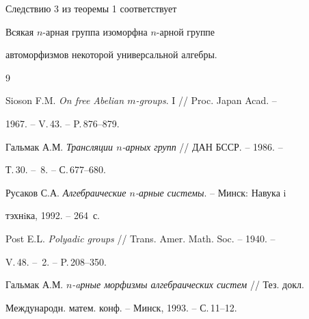 Следствию 3 из теоремы 1 соответствует





\begin{cor}


Всякая $n$-арная группа изоморфна $n$-арной группе


автоморфизмов некоторой универсальной алгебры.


\end{cor}





\begin{thebibliography}{9}







Sioson F.M. {\em On free Abelian $m$-groups}. I // Proc. Japan Acad. --


1967. -- V.\,43. -- P.\,876--879.




Гальмак А.М. {\em Трансляции $n$-арных групп} // ДАН БССР. -- 1986. --


Т.\,30. -- \No\,8. -- С.\,677--680.




Русаков С.А. {\em Алгебраические $n$-арные системы}. -- Минск: Навука i


тэхнiка, 1992. -- 264~с.




Post E.L. {\em Polyadic groups} // Trans. Amer. Math. Soc. -- 1940. --


V.\,48. -- \No\,2. -- P.\,208--350.




Гальмак А.М. {\em $n$-aрные морфизмы алгебраических систем} // Тез. докл.


Международн. матем. конф. -- Минск, 1993. -- С.\,11--12.





\end{thebibliography}





\vskip 0.5cm











\label{end}














